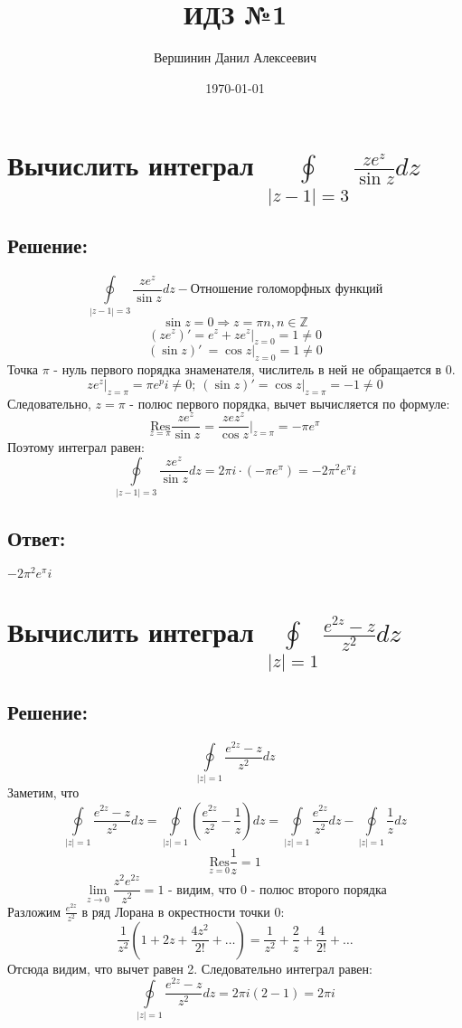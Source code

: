 \documentclass{article}
\title{\vspace{-1cm}ИДЗ №1}
\author{Вершинин Данил Алексеевич}
\date{\today}
\begin{document}
	
	\maketitle
	\section{Вычислить интеграл $\oint\limits_{|z-1|=3} \frac{ze^z}{\sin z}dz$}
	\subsection{Решение:}
	\[\oint\limits_{|z-1|=3} \frac{ze^z}{\sin z}dz - \text{Отношение голоморфных функций}\]
	\[\sin z = 0 \Rightarrow z = \pi n, n \in \mathbb{Z}\]
	\[(ze^z)' = e^z + ze^z \bigg|_{z=0} = 1 \ne 0\]
	\[(\sin z)'\ = \cos z \bigg|_{z=0} = 1 \ne 0\]
	Точка $\pi$ - нуль первого порядка знаменателя, числитель в ней не обращается в 0.
	\[ze^z \bigg|_{z=\pi} = \pi e^ pi \ne 0; \ (\sin z )' = \cos z \bigg|_{z=\pi} = -1 \ne 0\]
	Следовательно, $z=\pi$ - полюс первого порядка, вычет вычисляется по формуле:
	\[\underset{z=\pi}{\text{Res}} \frac{ze^z}{\sin z } = \frac{zez^z}{\cos z}\bigg|_{z=\pi} = -\pi e^\pi\]
	Поэтому интеграл равен:
	\[\oint\limits_{|z-1|=3} \frac{ze^z}{\sin z}dz = 2\pi i \cdot (-\pi e^\pi) =  -2\pi^2 e^\pi i\]
	
	\subsection{Ответ:}
	$ -2\pi^2 e^\pi i$
	
	\section{Вычислить интеграл $\oint\limits_{|z|=1}\frac{e^{2z}-z}{z^2} dz$}
	
	\subsection{Решение:}
	\[\oint\limits_{|z|=1}\frac{e^{2z}-z}{z^2} dz\]
	Заметим, что \[\oint\limits_{|z|=1}\frac{e^{2z}-z}{z^2} dz = \oint\limits_{|z|=1}\left(\frac{e^{2z}}{z^2} - \frac{1}{z}\right) dz = \oint\limits_{|z|=1}\frac{e^{2z}}{z^2}dz - \oint\limits_{|z|=1}\frac{1}{z}dz\]
	\[\underset{z=0}{\text{Res}} \frac{1}{z} = 1\]
	\[\lim\limits_{z\rightarrow0} \frac{z^2 e^{2z}}{z^2} = 1 \text{ - видим, что 0 - полюс второго порядка}\]
	Разложим $\frac{e^{2z}}{z^2}$ в ряд Лорана в окрестности точки 0:
	\[\frac{1}{z^2}\left(1 + 2z + \frac{4z^2}{2!} + \dots\right) = \frac{1}{z^2} + \frac{2}{z} + \frac{4}{2!} + \dots\]
	Отсюда видим, что вычет равен 2. Следовательно интеграл равен:
	\[\oint\limits_{|z|=1}\frac{e^{2z}-z}{z^2} dz = 2\pi i (2 - 1) = 2\pi i\]
\end{document}
